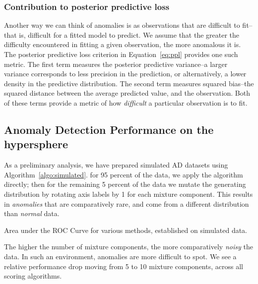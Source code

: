 \subsubsection{Contribution to posterior predictive loss}
Another way we can think of anomalies is as observations that are difficult to fit--that is, difficult
  for a fitted model to predict.  We assume that the greater the difficulty encountered in fitting a
  given observation, the more anomalous it is.  The posterior predictive loss criterion in
  Equation~\ref{eq:ppl} provides one such metric.  The first term measures the posterior predictive
  variance--a larger variance corresponds to less precision in the prediction, or alternatively, a lower
  density in the predictive distribution.  The second term measures squared bias--the squared distance
  between the average predicted value, and the observation.  Both of these terms provide a metric of
  how \emph{difficult} a particular observation is to fit.

\subsection{Anomaly Detection Performance on the hypersphere}
As a preliminary analysis, we have prepared simulated AD datasets using Algorithm~\ref{algo:simulated}.
  for 95 percent of the data, we apply the algorithm directly; then for the remaining 5 percent of the
  data we mutate the generating distribution by rotating axis labels by 1 for each mixture component.
  This results in \emph{anomalies} that are comparatively rare, and come from a different distribution
  than \emph{normal} data.

\begin{table}[h]
  \centering
  
  \caption{Area under the ROC Curve for various methods, established on simulated
    data.\label{tab:ad_sim_results}}
\end{table}

The higher the number of mixture components, the more comparatively \emph{noisy} the data.  In such
  an environment, anomalies are more difficult to spot.  We see a relative performance drop moving
  from 5 to 10 mixture components, across all scoring algorithms.





